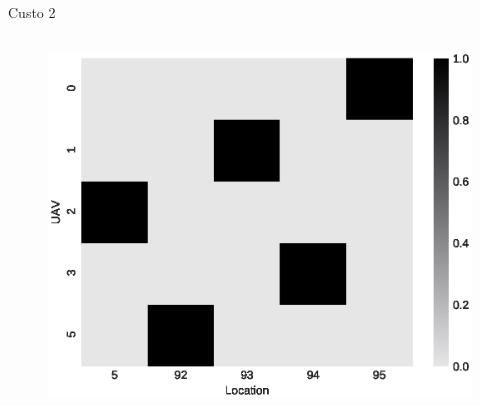 \begin{frame}{Custo 2}
\begin{columns}
\begin{column}{0.45\textwidth}
\begin{figure}[!htb]
                \end{figure}
                \vspace{-0.5cm}
               \begin{figure}[!htb]
                    \includegraphics[width=\textwidth]{custo_2/330_f_mij_.eps}
                \end{figure}
            \end{column}
        \end{columns}
    \end{frame}